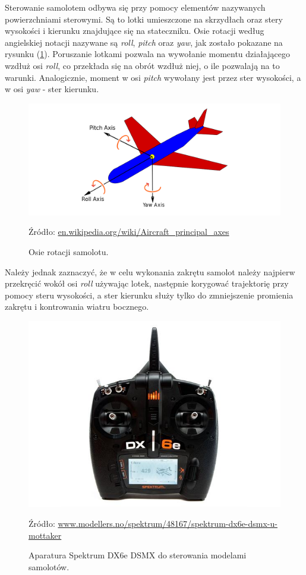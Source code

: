 \documentclass[12pt, a4paper]{article}
\let\oldref\ref
\renewcommand{\ref}[1]{(\oldref{#1})}
\begin{document}
Sterowanie samolotem odbywa się przy pomocy elementów nazywanych powierzchniami sterowymi. Są to lotki umieszczone na skrzydłach oraz stery wysokości i kierunku znajdujące się na stateczniku. Osie rotacji według angielskiej notacji nazywane są \textit{roll}, \textit{pitch} oraz \textit{yaw}, jak zostało pokazane na rysunku \ref{fig:osie}. Poruszanie lotkami pozwala na wywołanie momentu działającego wzdłuż osi \textit{roll}, co przekłada się na obrót wzdłuż niej, o ile pozwalają na to warunki. Analogicznie, moment w osi \textit{pitch} wywołany jest przez ster wysokości, a w osi \textit{yaw} - ster kierunku.

\begin{figure}[H]
    \centering
    \includegraphics[width=1\textwidth]{osie}
    \caption{Osie rotacji samolotu.}
    \small Źródło: \url{en.wikipedia.org/wiki/Aircraft_principal_axes}
    \label{fig:osie}
\end{figure}

Należy jednak zaznaczyć, że w celu wykonania zakrętu samolot należy najpierw przekręcić wokół osi \textit{roll} używając lotek, następnie korygować trajektorię przy pomocy steru wysokości, a ster kierunku służy tylko do zmniejszenie promienia zakrętu i kontrowania wiatru bocznego.

\begin{figure}[ht]
    \centering
    \includegraphics[width=1\textwidth]{dx6e}
    \caption{Aparatura Spektrum DX6e DSMX do sterowania modelami samolotów.}
    \small Źródło: \url{www.modellers.no/spektrum/48167/spektrum-dx6e-dsmx-u-mottaker}
    \label{fig:dx6e}
\end{figure}
\end{document}
